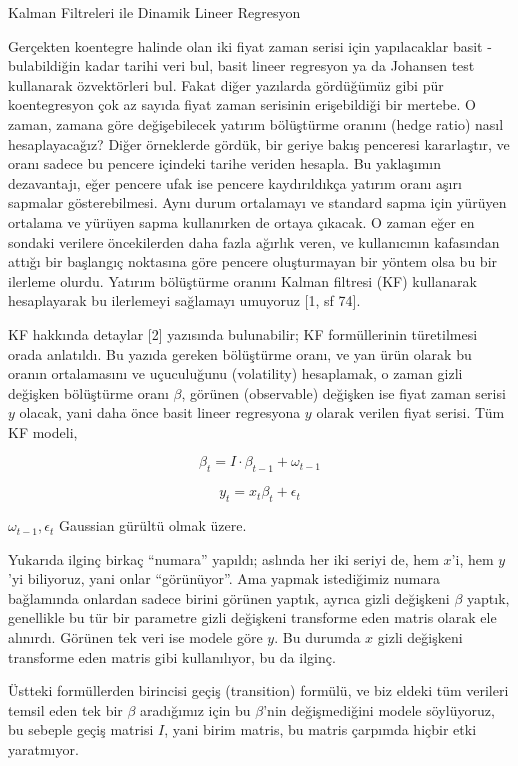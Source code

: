 \documentclass[12pt,fleqn]{article}\usepackage{../../common}
\begin{document}
Kalman Filtreleri ile Dinamik Lineer Regresyon

Gerçekten koentegre halinde olan iki fiyat zaman serisi için yapılacaklar
basit - bulabildiğin kadar tarihi veri bul, basit lineer regresyon ya da
Johansen test kullanarak özvektörleri bul. Fakat diğer yazılarda gördüğümüz
gibi pür koentegresyon çok az sayıda fiyat zaman serisinin erişebildiği bir
mertebe. O zaman, zamana göre değişebilecek yatırım bölüştürme oranını
(hedge ratio) nasıl hesaplayacağız? Diğer örneklerde gördük, bir geriye
bakış penceresi kararlaştır, ve oranı sadece bu pencere içindeki tarihe
veriden hesapla. Bu yaklaşımın dezavantajı, eğer pencere ufak ise pencere
kaydırıldıkça yatırım oranı aşırı sapmalar gösterebilmesi. Aynı durum
ortalamayı ve standard sapma için yürüyen ortalama ve yürüyen sapma
kullanırken de ortaya çıkacak. O zaman eğer en sondaki verilere
öncekilerden daha fazla ağırlık veren, ve kullanıcının kafasından attığı
bir başlangıç noktasına göre pencere oluşturmayan bir yöntem olsa bu bir
ilerleme olurdu. Yatırım bölüştürme oranını Kalman filtresi (KF) kullanarak
hesaplayarak bu ilerlemeyi sağlamayı umuyoruz [1, sf 74].

KF hakkında detaylar [2] yazısında bulunabilir; KF formüllerinin
türetilmesi orada anlatıldı. Bu yazıda gereken bölüştürme oranı, ve yan
ürün olarak bu oranın ortalamasını ve uçuculuğunu (volatility) hesaplamak,
o zaman gizli değişken bölüştürme oranı $\beta$, görünen (observable)
değişken ise fiyat zaman serisi $y$ olacak, yani daha önce basit lineer
regresyona $y$ olarak verilen fiyat serisi. Tüm KF modeli,

$$ \beta_t = I \cdot \beta_{t-1} + \omega_{t-1}$$

$$ y_t = x_t \beta_t + \epsilon_t $$

$\omega_{t-1},\epsilon_t$ Gaussian gürültü olmak üzere. 

Yukarıda ilginç birkaç ``numara'' yapıldı; aslında her iki seriyi de, hem
$x$'i, hem $y$'yi biliyoruz, yani onlar ``görünüyor''. Ama yapmak
istediğimiz numara bağlamında onlardan sadece birini görünen yaptık, ayrıca
gizli değişkeni $\beta$ yaptık, genellikle bu tür bir parametre gizli
değişkeni transforme eden matris olarak ele alınırdı. Görünen tek veri ise
modele göre $y$. Bu durumda $x$ gizli değişkeni transforme eden matris gibi
kullanılıyor, bu da ilginç. 

Üstteki formüllerden birincisi geçiş (transition) formülü, ve biz eldeki
tüm verileri temsil eden tek bir $\beta$ aradığımız için bu $\beta$'nin
değişmediğini modele söylüyoruz, bu sebeple geçiş matrisi $I$, yani birim
matris, bu matris çarpımda hiçbir etki yaratmıyor.
\end{document}
